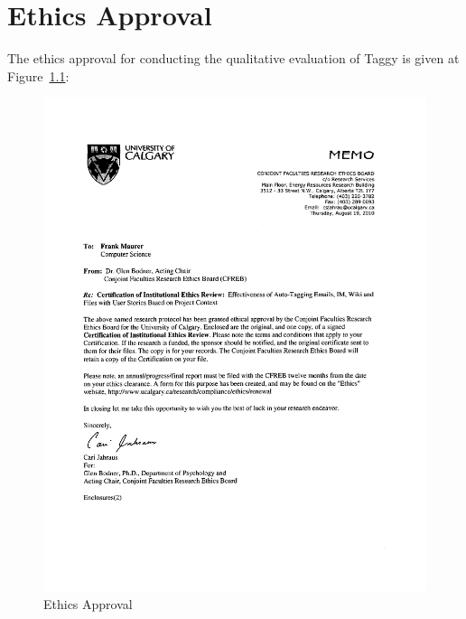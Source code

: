 \fancyhead[RO,LE]{\thepage}
\fancyfoot{} 
\chapter{Ethics Approval}

The ethics approval for conducting the qualitative evaluation of Taggy is given at Figure~\ref{fig:ethics}:

\begin{figure}[bt]
	\centering
	\includegraphics[width=\textwidth]{ethics.pdf}
    \caption{Ethics Approval}
	\label{fig:ethics}
\end{figure}




